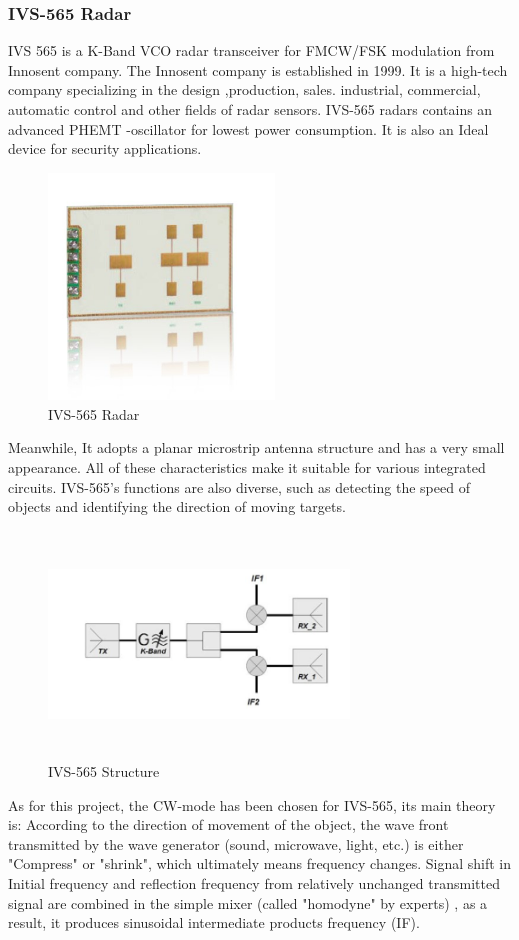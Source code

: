 \subsubsection{IVS-565 Radar}
IVS 565 is a K-Band VCO radar transceiver for FMCW/FSK modulation from Innosent company. 
The Innosent company is established in 1999. It is a high-tech company specializing in the design ,production, sales. industrial, commercial, automatic control and other fields of radar sensors.
IVS-565 radars contains an advanced PHEMT -oscillator for lowest power consumption. It is also an Ideal device for security applications. 
\begin{figure}[H]
    \centering
    \includegraphics[width=6cm]{figure/IVS-565Radar.jpg}
    \caption{IVS-565 Radar}
    \label{png_IVS565}
\end{figure}
Meanwhile, It adopts a planar microstrip antenna structure and has a very small appearance. All of these characteristics make it suitable for various integrated circuits. IVS-565’s functions are also diverse, such as detecting the speed of objects and identifying the direction of moving targets.
\begin{figure}[H]
    \centering
    \includegraphics[width=8cm,height=6cm]{figure/IVS-565Structure.jpg}
    \caption{IVS-565 Structure}
\end{figure}
As for this project, the CW-mode has been chosen for IVS-565, its main theory is: According to the direction of movement of the object, the wave front transmitted by the wave generator (sound, microwave, light, etc.) is either "Compress" or "shrink", which ultimately means frequency changes. Signal shift in Initial frequency and reflection frequency from relatively unchanged transmitted signal are combined in the simple mixer (called "homodyne" by experts) , as a result, it produces sinusoidal intermediate products frequency (IF).
